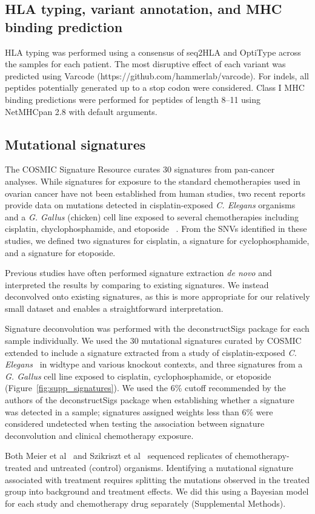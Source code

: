 \subsection*{HLA typing, variant annotation, and MHC binding prediction}
\begin{sloppypar}
HLA typing was performed using a consensus of seq2HLA\cite{Boegel_2012} and OptiType\cite{Szolek_2014} across the samples for each patient. The most disruptive effect of each variant was predicted using Varcode (https://github.com/hammerlab/varcode). For indels, all peptides potentially generated up to a stop codon were considered. Class I MHC binding predictions were performed for peptides of length 8--11 using NetMHCpan 2.8\cite{Lundegaard_2008} with default arguments.
\end{sloppypar}

\subsection*{Mutational signatures}
The COSMIC Signature Resource curates 30 signatures from pan-cancer analyses. While signatures for exposure to the standard chemotherapies used in ovarian cancer have not been established from human studies, two recent reports provide data on mutations detected in cisplatin-exposed \textit{C. Elegans} organisms~\cite{Meier_2014} and a \textit{G. Gallus} (chicken) cell line exposed to several chemotherapies including cisplatin, chyclophosphamide, and etoposide ~\cite{Szikriszt_2016}. From the SNVs identified in these studies, we defined two signatures for cisplatin, a signature for cyclophosphamide, and a signature for etoposide.

Previous studies have often performed signature extraction \textit{de novo} and interpreted the results by comparing to existing signatures. We instead deconvolved onto existing signatures, as this is more appropriate for our relatively small dataset and enables a straightforward interpretation.

Signature deconvolution was performed with the deconstructSigs\cite{Rosenthal_2016} package for each sample individually. We used the 30 mutational signatures curated by COSMIC~\cite{364242} extended to include a signature extracted from a study of cisplatin-exposed \textit{C. Elegans}~\cite{Meier_2014} in widtype and various knockout contexts, and three signatures from a \textit{G. Gallus} cell line exposed to cisplatin, cyclophosphamide, or etoposide~\cite{Szikriszt_2016} (Figure~\ref{fig:supp_signatures}). We used the 6\% cutoff recommended by the authors of the deconstructSigs package when establishing whether a signature was detected in a sample; signatures assigned weights less than 6\% were considered undetected when testing the association between signature deconvolution and clinical chemotherapy exposure.

Both Meier et al~\cite{Meier_2014} and Szikriszt et al~\cite{Szikriszt_2016} sequenced replicates of chemotherapy-treated and untreated (control) organisms. Identifying a mutational signature associated with treatment requires splitting the mutations observed in the treated group into background and treatment effects. We did this using a Bayesian model for each study and chemotherapy drug separately (Supplemental Methods).

